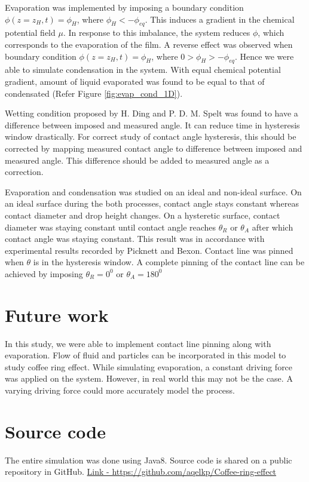 \documentclass[11pt]{article}
\begin{document}
\par
Evaporation was implemented by imposing a boundary condition $\phi(z=z_{H},t)=\phi_{H}$, where $\phi_{H} < -\phi_{eq}$. This induces a gradient in the chemical potential field $\mu$. In response to this imbalance, the system reduces $\phi$, which corresponds to the evaporation of the film\cite{paper:evaporation}. A reverse effect was observed when boundary condition $\phi(z=z_{H},t)=\phi_{H}$, where $0 > \phi_{H} > -\phi_{eq}$. Hence we were able to simulate condensation in the system. With equal chemical potential gradient, amount of liquid evaporated was found to be equal to that of condensated (Refer 
Figure \ref{fig:evap_cond_1D}).

\par
Wetting condition proposed by H. Ding and P. D. M. Spelt\cite{PhysRevE.75.046708} was found to have a difference between imposed and measured angle. It can reduce time in hysteresis window drastically. For correct study of contact angle hysteresis, this should be corrected by mapping measured contact angle to difference between imposed and measured angle. This difference should be added to measured angle as a correction.


\par
Evaporation and condensation was studied on an ideal and non-ideal surface. On an ideal surface during the both processes, contact angle stays constant whereas contact diameter and drop height changes. On a hysteretic surface, contact diameter was staying constant until contact angle reaches $\theta_{R}$ or $\theta_{A}$ after which contact angle was staying constant. This result was in accordance with experimental results recorded by Picknett and Bexon\cite{PICKNETT1977336}. Contact line was pinned when $\theta$ is in the hysteresis window. A complete pinning of the contact line can be achieved by imposing $\theta_{R}=0^{0}$ or $\theta_{A}=180^{0}$

\section{Future work}
In this study, we were able to implement contact line pinning along with evaporation. Flow of fluid and particles can be incorporated in this model to study coffee ring effect. While simulating evaporation, a constant driving force was applied on the system. However, in real world this may not be the case. A varying driving force could more accurately model the process.  

\section{Source code}
The entire simulation was done using Java8. Source code is shared on a public repository in GitHub. \href{https://github.com/aqelkp/Coffee-ring-effect}{Link - https://github.com/aqelkp/Coffee-ring-effect}

 

 
\end{document}
